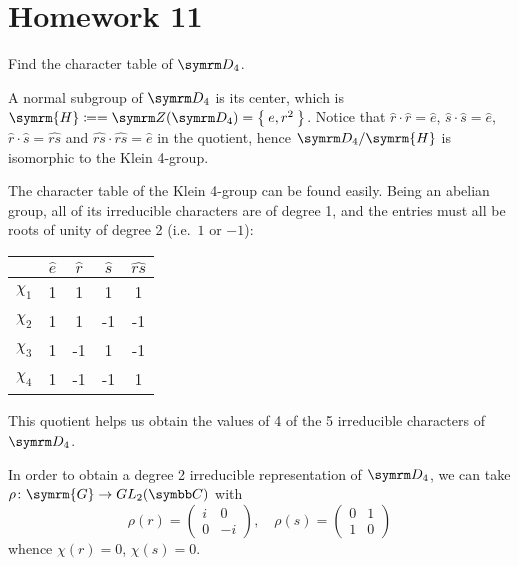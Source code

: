 \section*{Homework 11}

\begin{exercise}
Find the character table of \(\dihedralgroup{4}\).
\end{exercise}
\begin{solution}
A normal subgroup of \(\dihedralgroup{4}\) is its center, which is \(\symrm{H} \coloneqq = \centerofgroup(\dihedralgroup{4}) = \Set{e, r^2}\). Notice that \(\widehat{r} \cdot \widehat{r} = \widehat{e}\), \(\widehat{s} \cdot \widehat{s} = \widehat{e}\), \(\widehat{r} \cdot \widehat{s} = \widehat{rs}\) and \(\widehat{rs} \cdot \widehat{rs} = \widehat{e}\) in the quotient, hence \(\dihedralgroup{4} / \symrm{H}\) is isomorphic to the Klein 4-group.

The character table of the Klein 4-group can be found easily. Being an abelian group, all of its irreducible characters are of degree 1, and the entries must all be roots of unity of degree 2 (i.e.\ \(1\) or \(-1\)):
\begin{center}
    \begin{tabular}{c|c|c|c|c}
        & \(\widehat{e}\) & \(\widehat{r}\) & \(\widehat{s}\) & \(\widehat{rs}\) \\
        \hline
        \(\chi_1\) & 1 & 1 & 1 & 1 \\
        \hline
        \(\chi_2\) & 1 & 1 & -1 & -1 \\
        \hline
        \(\chi_3\) & 1 & -1 & 1 & -1 \\
        \hline
        \(\chi_4\) & 1 & -1 & -1 & 1
    \end{tabular}
\end{center}
This quotient helps us obtain the values of 4 of the 5 irreducible characters of \(\dihedralgroup{4}\).

In order to obtain a degree 2 irreducible representation of \(\dihedralgroup{4}\), we can take \(\rho \colon \symrm{G} \to GL_2 (\complex)\) with
\[
    \rho(r) = \begin{pmatrix}
        i & 0 \\
        0 & -i
    \end{pmatrix},
    \quad
    \rho(s) = \begin{pmatrix}
        0 & 1 \\
        1 & 0
    \end{pmatrix}
\]
whence \(\chi(r) = 0\), \(\chi(s) = 0\).


\end{solution}
